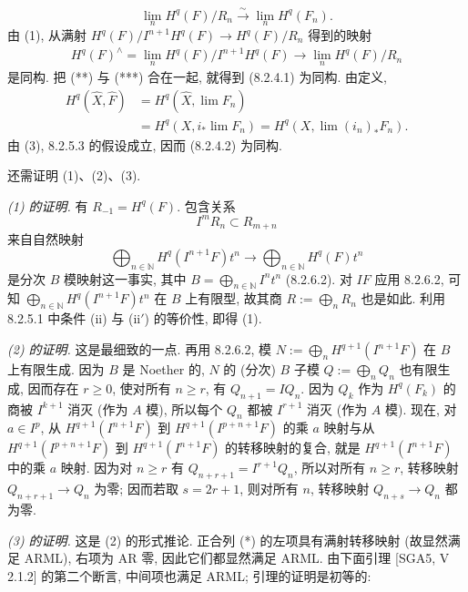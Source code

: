 \begin{equation}\lim_nH^q(F)/R_n\xrightarrow\sim\lim_nH^q(F_n).\tag{**}\label{ch08:eq827stars}\end{equation}
由 (1), 从满射 $H^q(F)/I^{n+1}H^q(F)\to H^q(F)/R_n$ 得到的映射
\begin{equation}\begin{aligned}
H^q(F)^\wedge=\lim_nH^q(F)/I^{n+1}H^q(F)\longrightarrow\lim_nH^q(F)/R_n
\end{aligned}\tag{***}\label{ch08:eq827star3}\end{equation}
是同构. 把 (**) 与 (***) 合在一起, 就得到 (8.2.4.1) 为同构. 由定义,
\[\begin{aligned}
H^q(\widehat X,\widehat F)&=H^q(\widehat X,\lim F_n)\\
&=H^q(X,i_*\lim F_n)=H^q(X,\lim(i_n)_*F_n).
\end{aligned}\]
由 (3), 8.2.5.3 的假设成立, 因而 (8.2.4.2) 为同构.

还需证明 (1)、(2)、(3).

\emph{(1) 的证明.} 有 $R_{-1}=H^q(F)$. 包含关系
\[I^mR_n\subset R_{m+n}\]
来自自然映射
\[\bigoplus_{n\in\mathbb N}H^q(I^{n+1}F)t^n\longrightarrow\bigoplus_{n\in\mathbb N}H^q(F)t^n\]
是分次 $B$ 模映射这一事实, 其中 $B=\bigoplus_{n\in\mathbb N}I^nt^n$ (8.2.6.2). 对 $IF$ 应用 8.2.6.2, 可知 $\bigoplus_{n\in\mathbb N}H^q(I^{n+1}F)t^n$ 在 $B$ 上有限型, 故其商 $R:=\bigoplus_nR_n$ 也是如此. 利用 8.2.5.1 中条件 (ii) 与 (ii$'$) 的等价性, 即得 (1).

\emph{(2) 的证明.} 这是最细致的一点. 再用 8.2.6.2, 模 $N:=\bigoplus_nH^{q+1}(I^{n+1}F)$ 在 $B$ 上有限生成. 因为 $B$ 是 Noether 的, $N$ 的 (分次) $B$ 子模 $Q:=\bigoplus_nQ_n$ 也有限生成, 因而存在 $r\geq0$, 使对所有 $n\geq r$, 有 $Q_{n+1}=IQ_n$. 因为 $Q_k$ 作为 $H^q(F_k)$ 的商被 $I^{k+1}$ 消灭 (作为 $A$ 模), 所以每个 $Q_n$ 都被 $I^{r+1}$ 消灭 (作为 $A$ 模). 现在, 对 $a\in I^p$, 从 $H^{q+1}(I^{n+1}F)$ 到 $H^{q+1}(I^{p+n+1}F)$ 的乘 $a$ 映射与从 $H^{q+1}(I^{p+n+1}F)$ 到 $H^{q+1}(I^{n+1}F)$ 的转移映射的复合, 就是 $H^{q+1}(I^{n+1}F)$ 中的乘 $a$ 映射. 因为对 $n\geq r$ 有 $Q_{n+r+1}=I^{r+1}Q_n$, 所以对所有 $n\geq r$, 转移映射 $Q_{n+r+1}\to Q_n$ 为零; 因而若取 $s=2r+1$, 则对所有 $n$, 转移映射 $Q_{n+s}\to Q_n$ 都为零.

\emph{(3) 的证明.} 这是 (2) 的形式推论. 正合列 (*) 的左项具有满射转移映射 (故显然满足 ARML), 右项为 AR 零, 因此它们都显然满足 ARML. 由下面引理 [SGA5, V 2.1.2] 的第二个断言, 中间项也满足 ARML; 引理的证明是初等的:

